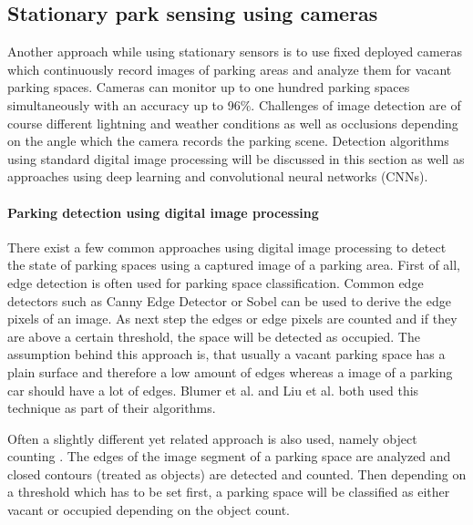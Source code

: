 




\subsection{Stationary park sensing using cameras}
\label{sec:stationary_park_sensing_cameras}

Another approach while using stationary sensors is to use fixed deployed cameras which continuously record images of parking areas and analyze them for vacant parking spaces. Cameras can monitor up to one hundred parking spaces simultaneously with an accuracy up to 96\%. Challenges of image detection are of course different lightning and weather conditions as well as occlusions depending on the angle which the camera records the parking scene. Detection algorithms using standard digital image processing will be discussed in this section as well as approaches using deep learning and convolutional neural networks (CNNs).

\paragraph{Parking detection using digital image processing}

There exist a few common approaches using digital image processing to detect the state of parking spaces using a captured image of a parking area. First of all, edge detection is often used for parking space classification. Common edge detectors such as Canny Edge Detector or Sobel can be used to derive the edge pixels of an image. As next step the edges or edge pixels are counted and if they are above a certain threshold, the space will be detected as occupied. The assumption behind this approach is, that usually a vacant parking space has a plain surface and therefore a low amount of edges whereas a image of a parking car should have a lot of edges. Blumer et al. \cite{Blumer2012} and Liu et al. \cite{stationary_camera_sensing} both used this technique as part of their algorithms. 

Often a slightly different yet related approach is also used, namely object counting \cite{stationary_camera_sensing}. The edges of the image segment of a parking space are analyzed and closed contours (treated as objects) are detected and counted. Then depending on a threshold which has to be set first, a parking space will be classified as either vacant or occupied depending on the object count.

